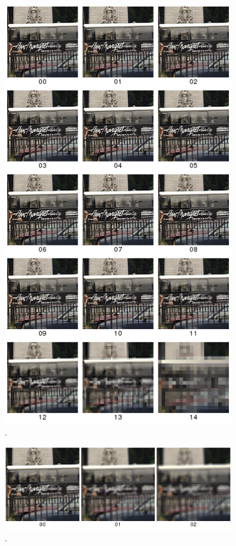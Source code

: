 \begin{figure}[!htb]
	\centering
	\includegraphics[width=0.9\textwidth]{./imgs/blockbus.png}
	\caption{.}
	\label{fig:blockbus}
\end{figure}

\begin{figure}[!htb]
	\centering
	\includegraphics[width=0.9\textwidth]{./imgs/bluraverage.png}
	\caption{.}
	\label{fig:bluraverage}
\end{figure}


